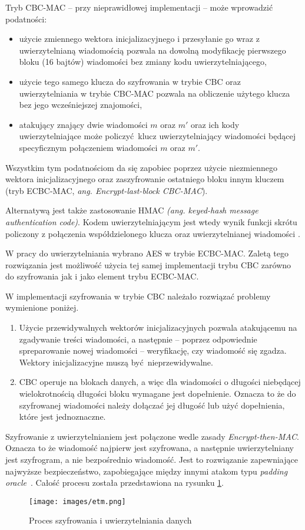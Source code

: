 Tryb CBC-MAC -- przy nieprawidłowej implementacji -- może wprowadzić podatności:

\begin{itemize}
    \item użycie zmiennego wektora inicjalizacyjnego i przesyłanie go wraz z uwierzytelnianą wiadomością pozwala na dowolną modyfikację pierwszego bloku (16 bajtów) wiadomości bez zmiany kodu uwierzytelniającego,
    \item użycie tego samego klucza do szyfrowania w trybie CBC oraz uwierzytelniania w trybie CBC-MAC pozwala na obliczenie użytego klucza bez jego wcześniejszej znajomości,
    \item atakujący znający dwie wiadomości $ m $ oraz $ m' $ oraz ich kody uwierzytelniające może policzyć klucz uwierzytelniający wiadomości będącej specyficznym połączeniem wiadomości $ m $ oraz $ m' $.
\end{itemize}

Wszystkim tym podatnościom da się zapobiec poprzez użycie niezmiennego wektora inicjalizacyjnego oraz zaszyfrowanie ostatniego bloku innym kluczem (tryb ECBC-MAC, {\itshape ang. Encrypt-last-block CBC-MAC}).

Alternatywą jest także zastosowanie HMAC {\itshape (ang. keyed-hash message authentication code)}. Kodem uwierzytelniającym jest wtedy wynik funkcji skrótu policzony z połączenia współdzielonego klucza oraz uwierzytelnianej wiadomości \cite{krawczyk1997hmac}.

W pracy do uwierzytelniania wybrano AES w trybie ECBC-MAC. Zaletą tego rozwiązania jest możliwość użycia tej samej implementacji trybu CBC zarówno do szyfrowania jak i jako element trybu ECBC-MAC.

W implementacji szyfrowania w trybie CBC należało rozwiązać problemy wymienione poniżej.

\begin{enumerate}
    \item Użycie przewidywalnych wektorów inicjalizacyjnych pozwala atakującemu na zgadywanie treści wiadomości, a następnie -- poprzez odpowiednie spreparowanie nowej wiadomości -- weryfikację, czy wiadomość się zgadza. Wektory inicjalizacyjne muszą być nieprzewidywalne.
    \item CBC operuje na blokach danych, a więc dla wiadomości o długości niebędącej wielokrotnością długości bloku wymagane jest dopełnienie. Oznacza to że do szyfrowanej wiadomości należy dołączać jej długość lub użyć dopełnienia, które jest jednoznaczne.
\end{enumerate}

Szyfrowanie z uwierzytelnianiem jest połączone wedle zasady {\itshape Encrypt-then-MAC}. Oznacza to że wiadomość najpierw jest szyfrowana, a następnie uwierzytelniany jest szyfrogram, a nie bezpośrednio wiadomość. Jest to rozwiązanie zapewniające najwyższe bezpieczeństwo, zapobiegające między innymi atakom typu \emph{padding oracle}~\cite{black2011authenticated}. Całość procesu została przedstawiona na rysunku \ref{fig:etm}.

\begin{figure}[h]
\centering
\texttt{[image: images/etm.png]}
\caption{Proces szyfrowania i uwierzytelniania danych}
\label{fig:etm}
\end{figure}
